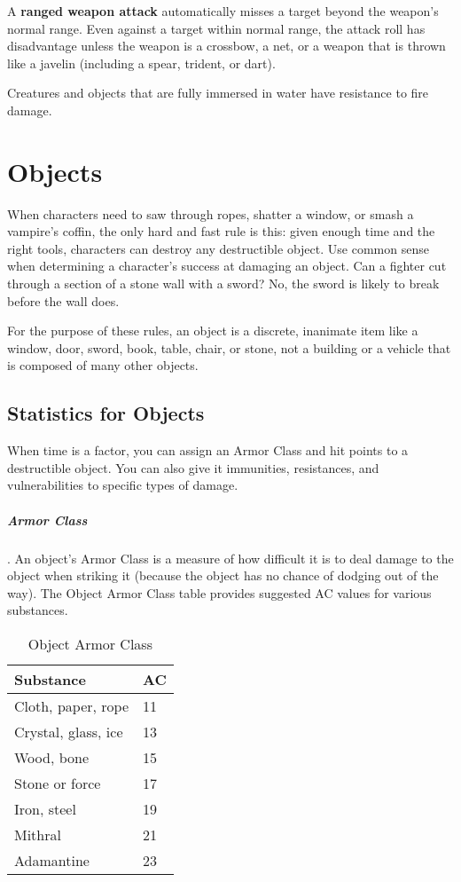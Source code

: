 A \textbf{ranged weapon attack} automatically misses a target beyond the weapon's normal range. Even against a target within normal range, the attack roll has disadvantage unless the weapon is a crossbow, a net, or a weapon that is thrown like a javelin (including a spear, trident, or dart).

Creatures and objects that are fully immersed in water have resistance to fire damage.

\section{Objects}

When characters need to saw through ropes, shatter a window, or smash a vampire's coffin, the only hard and fast rule is this: given enough time and the right tools, characters can destroy any destructible object. Use common sense when determining a character's success at damaging an object. Can a fighter cut through a section of a stone wall with a sword? No, the sword is likely to break before the wall does.

For the purpose of these rules, an object is a discrete, inanimate item like a window, door, sword, book, table, chair, or stone, not a building or a vehicle that is composed of many other objects.

\subsection{Statistics for Objects}

When time is a factor, you can assign an Armor Class and hit points to a destructible object. You can also give it immunities, resistances, and vulnerabilities to specific types of damage.

\subparagraph*{Armor Class}. An object's Armor Class is a measure of how difficult it is to deal damage to the object when striking it (because the object has no chance of dodging out of the way). The Object Armor Class table provides suggested AC values for various substances.

\begin{table}
    \centering
    \begin{tabular}{|l|l|}
        \hline
        Substance & AC \\\hline
        Cloth, paper, rope  & 11 \\\hline
        Crystal, glass, ice & 13 \\\hline
        Wood, bone          & 15 \\\hline
        Stone or force      & 17 \\\hline
        Iron, steel         & 19 \\\hline
        Mithral             & 21 \\\hline
        Adamantine          & 23 \\\hline
    \end{tabular}
    \caption[Object AC]{Object Armor Class}
    \label{tbl:object-ac}
\end{table}

